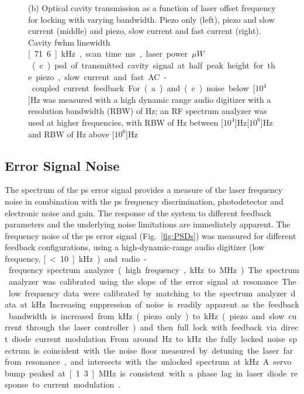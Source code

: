 \begin{figure}[htbp]
{(b) Optical cavity transmission as a function of laser offset frequency for locking with varying bandwidth.
Piezo only (left), piezo and slow current (middle) and piezo, slow current and fast current (right).
Cavity \gls*{fwhm} linewidth \unit[71.6]{kHz}, scan time \unit[100]{ms}, laser power \unit[170]{$\mu W$}.
(c) \Gls*{psd} of transmitted cavity signal at half peak height for the piezo, slow current and fast AC-coupled current feedback.
For (a) and (c) noise below \unit[$10^4$]{Hz} was measured with a high dynamic range audio digitizer with a resolution bandwidth (RBW) of \unit[12]{Hz}; an RF spectrum analyzer was used at higher frequencies, with RBW of \unit[30]{Hz} between \unit[$10^4$]{Hz}\textendash\unit[$10^6$]{Hz} and RBW of \unit[300]{Hz} above \unit[$10^6$]{Hz}} 
\end{figure}

\subsection{Error Signal Noise}
The spectrum of the \gls*{ps} error signal provides a measure of the laser frequency noise in combination with the \gls*{ps} frequency discrimination, photodetector and electronic noise and gain.
The response of the system to different feedback parameters and the underlying noise limitations are immediately apparent.
The frequency noise  of the \gls*{ps} error signal (Fig.~\ref{fig:PSDs}) was measured for different feedback configurations, using a high-dynamic-range audio digitizer (low frequency, \unit[\textless10]{kHz}) and radio-frequency spectrum analyzer (high frequency, \unit[10]{kHz} to \unit[30]{MHz}).
The spectrum analyzer was calibrated using the slope of the error signal at resonance.
The low frequency data were calibrated by matching to the spectrum analyzer data at \unit[10]{kHz}.  

Increasing suppression of noise is readily apparent as the feedback bandwidth is increased from \unit[1]{kHz} (piezo only) to \unit[50]{kHz} (piezo and slow current through the laser controller) and then full lock with feedback via direct diode current modulation.
From around \unit[450]{Hz} to \unit[350]{kHz} the fully locked noise spectrum is coincident with the noise floor measured by detuning the laser far from resonance, and intersects with the unlocked spectrum at \unit[700]{kHz}.
A servo bump peaked at \unit[1.3]{MHz} is consistent with a phase lag in laser diode response to current modulation \cite{wiemanhollberg}.

